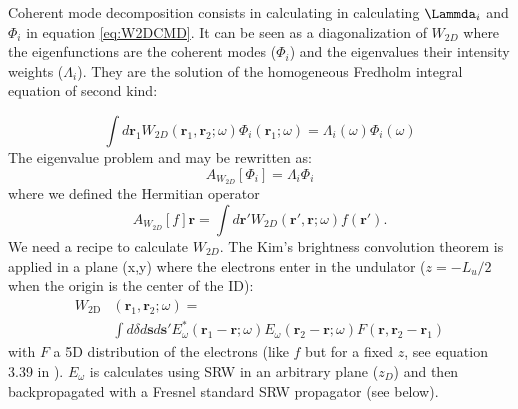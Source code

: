 \documentclass{iucr}              %
\begin{document}
Coherent mode decomposition consists in calculating in calculating $\Lammda_i$ and $\Phi_i$ in equation \ref{eq:W2DCMD}. It can be seen as a diagonalization of $W_{2D}$ where the eigenfunctions are the coherent modes ($\Phi_i$) and the eigenvalues their intensity weights ($\Lambda_i$). They are the solution of the homogeneous Fredholm integral equation of second kind:

\begin{equation}\label{fredholm_equation}
\int d\textbf{r}_1 W_{2D}(\textbf{r}_1,\textbf{r}_2;\omega)
\Phi_i(\textbf{r}_1;\omega) = \Lambda_i(\omega) \Phi_i(\omega)
\end{equation}
The eigenvalue problem and may be rewritten as:
\begin{equation}
A_{W_{2D}}[\Phi_i] = \Lambda_i \Phi_i
\end{equation}
where we defined the Hermitian operator
\begin{equation}
A_{W_{2D}}[f]\textbf{r}  = \int d\textbf{r}' W_{2D}(\textbf{r}',\textbf{r};\omega) f(\textbf{r}').
\end{equation}
We need a recipe to calculate $W_{2D}$. The Kim's brightness convolution theorem \cite{KimConvolution} is applied in a plane (x,y) where the electrons enter in the undulator ($z=-L_u/2$ when the origin is the center of the ID):
\begin{equation}
\begin{split}
    W_\text{2D}&(\textbf{r}_1,\textbf{r}_2;\omega) = \\
    &\int d \delta d\textbf{s} d\textbf{s}'
    E_\omega^*(\textbf{r}_1-\textbf{r};\omega)
    E_\omega(\textbf{r}_2-\textbf{r};\omega)
    F(\textbf{r}, \textbf{r}_2-\textbf{r}_1)
\end{split}\label{eq:comsyl_W2D}
\end{equation}
with $F$ a 5D distribution of the electrons (like $f$ but for a fixed $z$, see equation 3.39 in \cite{glassThesis}). $E_\omega$ is calculates using SRW in an arbitrary plane ($z_D$) and then backpropagated with a Fresnel standard SRW propagator (see below). 
\end{document}
